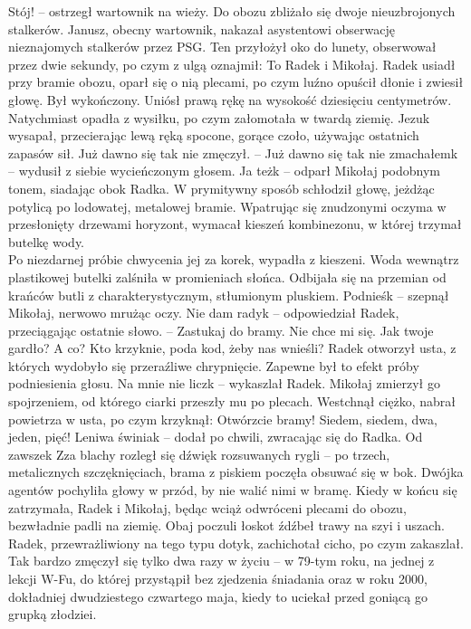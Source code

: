 \documentclass[../MAIN.tex]{subfiles}
\begin{document}
\dd
\sx Stój! -- ostrzegł wartownik na wieży.
\qd
Do obozu zbliżało się dwoje nieuzbrojonych stalkerów. Janusz, obecny wartownik, nakazał asystentowi obserwację nieznajomych stalkerów przez PSG. Ten przyłożył oko do lunety, obserwował przez dwie sekundy, po czym z ulgą oznajmił:
\sx To Radek i Mikołaj.
\qd
Radek usiadł przy bramie obozu, oparł się o nią plecami, po czym luźno opuścił dłonie i zwiesił głowę. Był wykończony. Uniósł prawą rękę na wysokość dziesięciu centymetrów.\\
Natychmiast opadła z wysiłku, po czym załomotała w twardą ziemię.
\sx Jezu\3k wysapał, przecierając lewą ręką spocone, gorące czoło, używając ostatnich zapasów sił. Już dawno się tak nie zmęczył. -- Już dawno się tak nie zmachałem\3k -- wydusił z siebie wycieńczonym głosem.
\xx Ja też\3k -- odparł Mikołaj podobnym tonem, siadając obok Radka.
\qd
W prymitywny sposób schłodził głowę, jeżdżąc potylicą po lodowatej, metalowej bramie. Wpatrując się znudzonymi oczyma w przesłonięty drzewami horyzont, wymacał kieszeń kombinezonu, w której trzymał butelkę wody.\\
Po niezdarnej próbie chwycenia jej za korek, wypadła z kieszeni. Woda wewnątrz plastikowej butelki zalśniła w promieniach słońca. Odbijała się na przemian od krańców butli z charakterystycznym, stłumionym pluskiem.
\sx Podnieś\3k -- szepnął Mikołaj, nerwowo mrużąc oczy.
\xx Nie dam rady\3k -- odpowiedział Radek, przeciągając ostatnie słowo. -- Zastukaj do bramy.
\xx Nie chce mi się. Jak twoje gardło?
\xx A co?
\xx Kto krzyknie, poda kod, żeby nas wnieśli?
\qd
Radek otworzył usta, z których wydobyło się przeraźliwe chrypnięcie. Zapewne był to efekt próby podniesienia głosu.
\sx Na mnie nie licz\3k -- wykaszlał Radek. Mikołaj zmierzył go spojrzeniem, od którego ciarki przeszły mu po plecach. Westchnął ciężko, nabrał powietrza w usta, po czym krzyknął:
\xx Otwórzcie bramy! Siedem, siedem, dwa, jeden, pięć! Leniwa świnia\3k -- dodał po chwili, zwracając się do Radka.
\xx Od zawsze\3k
\qd
Zza blachy rozległ się dźwięk rozsuwanych rygli -- po trzech, metalicznych szczęknięciach, brama z piskiem poczęła obsuwać się w bok. Dwójka agentów pochyliła głowy w przód, by nie walić nimi w bramę. Kiedy w końcu się zatrzymała, Radek i Mikołaj, będąc wciąż odwróceni plecami do obozu, bezwładnie padli na ziemię. Obaj poczuli łoskot źdźbeł trawy na szyi i uszach. Radek, przewrażliwiony na tego typu dotyk, zachichotał cicho, po czym zakaszlał. Tak bardzo zmęczył się tylko dwa razy w życiu -- w 79-tym roku, na jednej z lekcji W-Fu, do której przystąpił bez zjedzenia śniadania oraz w roku 2000, dokładniej dwudziestego czwartego maja, kiedy to uciekał przed goniącą go grupką złodziei.\\
\end{document}
